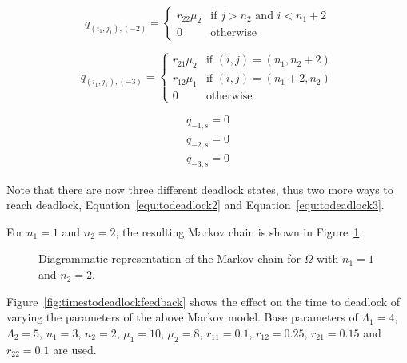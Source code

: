 \documentclass{article}
\numberwithin{equation}{section}
\begin{document}
\begin{equation}\label{equ:todeadlock3}
  q_{(i_1, j_1), (-2)} = \left\{
  \begin{array}{rr}
    r_{22}\mu_2 & \text{if } j > n_2 \text{ and } i < n_1 + 2 \\
    0 & \text{otherwise}
  \end{array}
  \right.
\end{equation}

\begin{equation}\label{eqn:2nssfB}
  q_{(i_1, j_1), (-3)} = \left\{
  \begin{array}{rr}
    r_{21}\mu_2 & \text{if } (i, j) = (n_1, n_2 + 2) \\
    r_{12}\mu_1 & \text{if } (i, j) = (n_1 + 2, n_2) \\
    0 & \text{otherwise}
  \end{array}
  \right.
\end{equation}

\begin{align}
  q_{-1, s} = 0 \\
  q_{-2, s} = 0 \\
  q_{-3, s} = 0
\end{align}

Note that there are now three different deadlock states, thus two more ways to
reach deadlock, Equation~\ref{equ:todeadlock2} and Equation~\ref{equ:todeadlock3}.

For $n_1 = 1$ and $n_2 = 2$, the resulting Markov chain is shown in
Figure~\ref{fig:2nodeMCfeedback}.

\begin{figure}[!htbp]
    \begin{center}
    
    \end{center}
    \caption{Diagrammatic representation of the Markov chain for $\Omega$ with
    $n_1=1$ and $n_2=2$.}
    \label{fig:2nodeMCfeedback}
\end{figure}

Figure~\ref{fig:timestodeadlockfeedback} shows the effect on the time to
deadlock of varying the parameters of the above Markov model.
Base parameters of $\Lambda_1 = 4$, $\Lambda_2 = 5$, $n_1 = 3$, $n_2 = 2$,
$\mu_1 = 10$, $\mu_2 = 8$, $r_{11} = 0.1$, $r_{12} = 0.25$, $r_{21} = 0.15$
and $r_{22} = 0.1$ are used.
\end{document}
